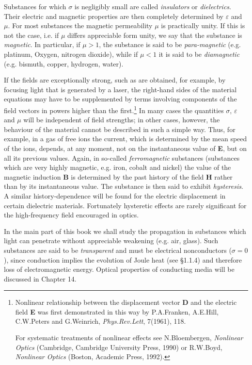 \documentclass[lang=en,11pt]{elegantbook}
\begin{document}
	Substances for which $\sigma$ is negligibly small are called \textit{insulators} or \textit{dielectrics}. Their electric and magnetic properties are then completely determined by $\varepsilon$ and $\mu$. For most substances the magnetic permeability $\mu$ is practically unity. If this is not the case, i.e. if $\mu$ differs appreciable form unity, we say that the substance is \textit{magnetic}. In particular, if $\mu>1$, the substance is said to be \textit{para-magnetic} (e.g. platinum, Oxygen, nitrogen dioxide), while if $\mu<1$ it is said to be \textit{diamagnetic} (e.g. bismuth, copper, hydrogen, water).\par
	If the fields are exceptionally strong, such as are obtained, for example, by focusing light that is generated by a laser, the right-hand sides of the material equations may have to be supplemented by terms involving components of the field vectors in powers higher than the first.\footnote{Nonlinear relationship between the displacement vector \textbf{D} and the electric field \textbf{E} was first demonstrated in this way by P.A.Franken, A.E.Hill, C.W.Peters and G.Weinrich, \textit{Phys.Rev.Lett}, 7(1961), 118.\par
		For systematic treatments of nonlinear effects see N.Bloembergen, \textit{Nonlinear Optics} (Cambridge, Cambridge University Press, 1990) or R.W.Boyd, \textit{Nonlinear Optics} (Boston, Academic Press, 1992).}
	In many cases the quantities $\sigma$, $\varepsilon$ and $\mu$ will be independent of field strengths; in other cases, however, the behaviour of the material cannot be described in such a simple way. Thus, for example, in a gas of free ions the current, which is determined by the mean speed of the ions, depends, at any moment, not on the instantaneous value of \textbf{E}, but on all its previous values. Again, in so-called \textit{ferromagnetic} substances (substances which are very highly magnetic, e.g. iron, cobalt and nickel) the value of the magnetic induction \textbf{B} is determined by the past history of the field \textbf{H} rather than by its instantaneous value. The substance is then said to exhibit \textit{hysteresis}. A similar history-dependence will be found for the electric displacement in certain dielectric materials. Fortunately hysteretic effects are rarely significant for the high-frequency field encouraged in optics.\par
	In the main part of this book we shall study the propagation in substances which light can penetrate without appreciable weakening (e.g. air, glass). Such substances are said to be \textit{transparent} and must be electrical nonconductors ($\sigma=0$), since conduction implies the evolution of Joule heat (see \S1.1.4) and therefore loss of electromagnetic energy. Optical properties of conducting media will be discussed in Chapter 14.
	
\end{document}
